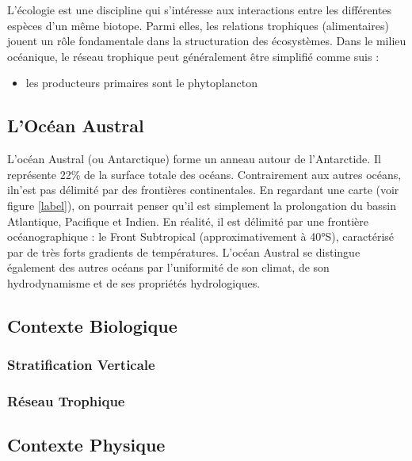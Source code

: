\documentclass{article}
\begin{document}
	L'écologie est une discipline qui s'intéresse aux interactions entre les différentes espèces d'un même biotope. Parmi elles, les relations trophiques (alimentaires) jouent un rôle fondamentale dans la structuration des écosystèmes. Dans le milieu océanique, le réseau trophique peut généralement être simplifié comme suis : 
	\begin{itemize} 	
		\item les producteurs primaires sont le phytoplancton
	\end{itemize}
	
	
	
	\subsection{L'Océan Austral}
	L'océan Austral (ou Antarctique) forme un anneau autour de l'Antarctide. Il représente 22\% de la surface totale des océans. Contrairement aux autres océans, iln'est pas délimité par des frontières continentales. En regardant une carte (voir figure \ref{label}), on pourrait penser qu'il est simplement la prolongation du bassin Atlantique, Pacifique et Indien. En réalité, il est délimité par une frontière océanographique : le Front Subtropical (approximativement à 40°S), caractérisé par de très forts gradients de températures. L'océan Austral se distingue également des autres océans par l'uniformité de son climat, de son hydrodynamisme et de ses propriétés hydrologiques.
	
	
	\subsection{Contexte Biologique}
	\subsubsection{Stratification Verticale}
	\subsubsection{Réseau Trophique}
	
	
	\subsection{Contexte Physique}
	
	
	
	
	
	
	
	
	
\end{document}
